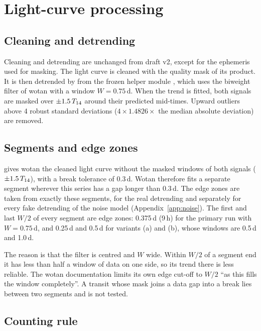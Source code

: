 \section{Light-curve processing} \label{app:processing}

\subsection{Cleaning and detrending}

Cleaning and detrending are unchanged from draft v2, except for the ephemeris used for masking. The light curve is
cleaned with the quality mask of its product. It is then detrended by  from the frozen helper module
, which uses the biweight filter of wotan \citep{Hippke2019} with a window $W = 0.75$\,d. When the
trend is fitted, both signals are masked over $\pm 1.5\,T_{14}$ around their predicted mid-times. Upward outliers
above 4 robust standard deviations ($4 \times 1.4826 \times$ the median absolute deviation) are removed.

\subsection{Segments and edge zones} \label{app:edges}

 gives wotan the cleaned light curve without the masked windows of both signals ($\pm
1.5\,T_{14}$), with a break tolerance of 0.3\,d. Wotan therefore fits a separate segment wherever this series has a
gap longer than 0.3\,d. The edge zones are taken from exactly these segments, for the real detrending and separately
for every fake detrending of the noise model (Appendix~\ref{app:noise}). The first and last $W/2$ of every segment are
edge zones: 0.375\,d (9\,h) for the primary run with $W = 0.75$\,d, and 0.25\,d and 0.5\,d for variants (a) and (b),
whose windows are 0.5\,d and 1.0\,d.

The reason is that the filter is centred and $W$ wide. Within $W/2$ of a segment end it has less than half a window of
data on one side, so its trend there is less reliable. The wotan documentation limits its own edge cut-off to $W/2$
``as this fills the window completely''. A transit whose mask joins a data gap into a break lies between two segments
and is not tested.

\subsection{Counting rule} \label{app:counting}

